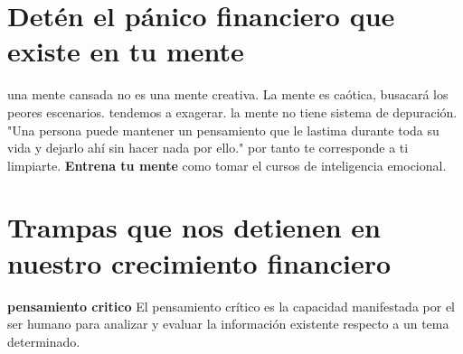 \documentclass{article}
\begin{document}
\section{Detén el pánico financiero que existe en tu mente}
una mente cansada no es una mente creativa.
La mente es caótica, busacará los peores escenarios.
tendemos a exagerar.
la mente no tiene sistema de depuración.
"Una persona puede
mantener un
pensamiento que le
lastima durante toda
su vida y dejarlo ahí
sin hacer nada por ello."
por tanto te corresponde a ti limpiarte. \textbf{Entrena tu mente}
como tomar el cursos de inteligencia emocional.

\section{Trampas que nos detienen en nuestro crecimiento financiero}

\textbf{pensamiento critico}
El pensamiento crítico es la capacidad
manifestada por el ser humano para
analizar y evaluar la información existente
respecto a un tema determinado.
\end{document}
